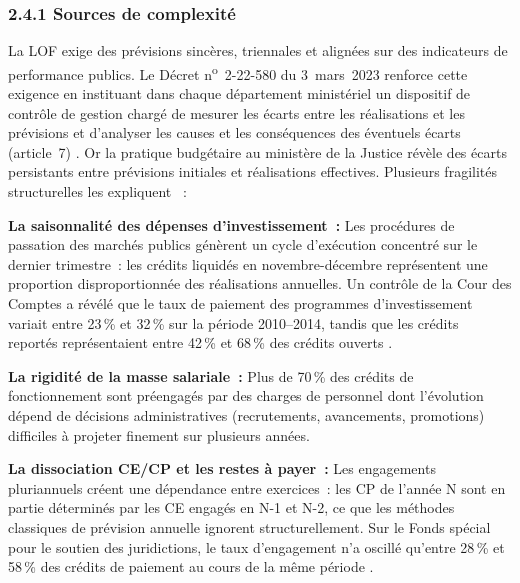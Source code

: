 \subsubsection*{2.4.1 \quad Sources de complexit\'e}

La LOF exige des pr\'evisions sinc\`eres, triennales et align\'ees sur des indicateurs de performance publics. Le D\'ecret n\textsuperscript{o}~2-22-580 du 3~mars~2023 renforce cette exigence en instituant dans chaque d\'epartement minist\'eriel un dispositif de contr\^ole de gestion charg\'e de \og{}mesurer les \'ecarts entre les r\'ealisations et les pr\'evisions et d'analyser les causes et les cons\'equences des \'eventuels \'ecarts\fg{} (article~7) \citep{DecretCDG2023}. Or la pratique budg\'etaire au minist\`ere de la Justice r\'ev\`ele des \'ecarts persistants entre pr\'evisions initiales et r\'ealisations effectives. Plusieurs fragilit\'es structurelles les expliquent \citep{Abdelali2019}~:

\textbf{La saisonnalit\'e des d\'epenses d'investissement~:} Les proc\'edures de passation des march\'es publics g\'en\`erent un cycle d'ex\'ecution concentr\'e sur le dernier trimestre~: les cr\'edits liquid\'es en novembre-d\'ecembre repr\'esentent une proportion disproportionn\'ee des r\'ealisations annuelles. Un contr\^ole de la Cour des Comptes a r\'ev\'el\'e que le taux de paiement des programmes d'investissement variait entre 23\,\% et 32\,\% sur la p\'eriode 2010--2014, tandis que les cr\'edits report\'es repr\'esentaient entre 42\,\% et 68\,\% des cr\'edits ouverts \citep{CourDesComptes2016}.

\textbf{La rigidit\'e de la masse salariale~:} Plus de 70\,\% des cr\'edits de fonctionnement sont pr\'eengag\'es par des charges de personnel dont l'\'evolution d\'epend de d\'ecisions administratives (recrutements, avancements, promotions) difficiles \`a projeter finement sur plusieurs ann\'ees.

\textbf{La dissociation CE/CP et les restes \`a payer~:} Les engagements pluriannuels cr\'eent une d\'ependance entre exercices~: les CP de l'ann\'ee N sont en partie d\'etermin\'es par les CE engag\'es en N-1 et N-2, ce que les m\'ethodes classiques de pr\'evision annuelle ignorent structurellement. Sur le Fonds sp\'ecial pour le soutien des juridictions, le taux d'engagement n'a oscill\'e qu'entre 28\,\% et 58\,\% des cr\'edits de paiement au cours de la m\^eme p\'eriode \citep{CourDesComptes2016}.

